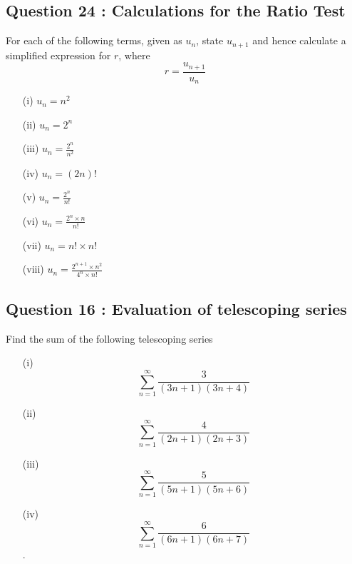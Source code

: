 \documentclass[]{article}
\begin{document}
\subsection*{Question 24 : Calculations for the Ratio Test}

For each of the following terms, given as $u_n$, state $u_{n+1}$ and hence calculate a simplified expression for $r$, where 
{
	\Large
	\[ r = \frac{u_{n+1}}{u_n}\]
}
{
	\Large
	\begin{multicols}{2}
		\begin{itemize}
			\item[(i)]  $u_n = \displaystyle{n^2}$\smallskip
			\item[(ii)] $u_n = \displaystyle{2^n}$ \smallskip
			\item[(iii)] $u_n = \displaystyle{\frac{2^n}{n^2}}$ \smallskip
			\item[(iv)] $u_n = (2n)!$
			\item[(v)] $u_n = \displaystyle{\frac{2^n}{n!}}$ \smallskip
			\item[(vi)] $u_n = \displaystyle{\frac{2^n \times n}{n!}}$\smallskip
			\item[(vii)] $u_n = n! \times n!$
			\item[(viii)] $u_n = \displaystyle{\frac{2^{n+1} \times n^2}{ 4^n \times n!}}$
			
		\end{itemize}
	\end{multicols}
	\smallskip
}


\subsection*{Question 16 : Evaluation of telescoping series}

Find the sum of the following telescoping series
\begin{multicols}{2}
	\begin{itemize}
		\item[(i)]
		\[  \sum^{\infty}_{n=1}   \frac{3}{(3n+1)(3n+4)}  \]
		
		\item[(ii)]
		\[  \sum^{\infty}_{n=1}   \frac{4}{(2n+1)(2n+3)}  \]
		
		\item[(iii)]
		\[  \sum^{\infty}_{n=1}   \frac{5}{(5n+1)(5n+6)}  \]
		
		\item[(iv)]
		\[  \sum^{\infty}_{n=1}  \frac{6}{(6n+1)(6n+7)}  \]
		.
	\end{itemize}
\end{multicols}
\end{document}
